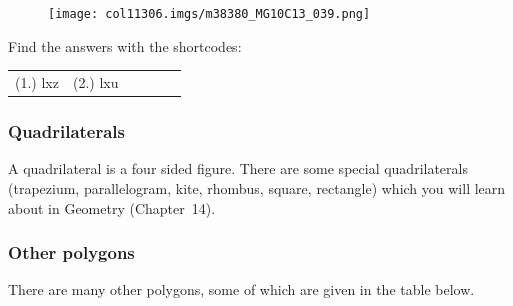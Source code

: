\begin{table}[H]
\begin{enumerate}[noitemsep, label=\textbf{\arabic*}. ]
    \setcounter{subfigure}{0}


	\begin{figure}[H] %
    \begin{center}
    \label{m38380*id318571!!!underscore!!!media}\label{m38380*id318571!!!underscore!!!printimage}\texttt{[image: col11306.imgs/m38380\_MG10C13\_039.png]} %
        
    
    \end{center}

 \end{figure}   

    \addtocounter{footnote}{-0}
            \end{enumerate}
        
          

        
  
      
      \label{m38380*eip-75}
\par {} Find the answers with the shortcodes:
 \par \begin{tabular}[h]{cccccc}
 (1.) lxz  &  (2.) lxu  & \end{tabular}



        \subsubsection{ Quadrilaterals}
        \nopagebreak
        \label{m38380*eip-366}
A quadrilateral is a four sided figure. There are some special quadrilaterals (trapezium, parallelogram, kite, rhombus, square, rectangle) which you will learn about in Geometry (Chapter~14). 
\par \label{m38380*uid91}
        \subsubsection{ Other polygons}
        \nopagebreak
        
        
        \label{m38380*id319439}There are many other polygons, some of which are given in the table below.\par 
        

\end{table}
